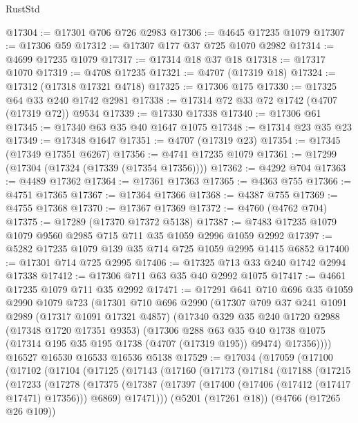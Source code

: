 \begin{lexlean}{RustStd}
\begin{coremodule}
@17304 := @17301 @706 @726 @2983
@17306 := @4645 @17235 @1079
@17307 := @17306 @59
@17312 := @17307 @177 @37 @725 @1070 @2982
@17314 := @4699 @17235 @1079
@17317 := @17314 @18 @37 @18
@17318 := @17317 @1070
@17319 := @4708 @17235
@17321 := @4707 (@17319 @18)
@17324 := @17312 (@17318 @17321 @4718)
@17325 := @17306 @175
@17330 := @17325 @64 @33 @240 @1742 @2981
@17338 := @17314 @72 @33 @72 @1742 (@4707 (@17319 @72)) @9534
@17339 := @17330 @17338
@17340 := @17306 @61
@17345 := @17340 @63 @35 @40 @1647 @1075
@17348 := @17314 @23 @35 @23
@17349 := @17348 @1647
@17351 := @4707 (@17319 @23)
@17354 := @17345 (@17349 @17351 @6267)
@17356 := @4741 @17235 @1079
@17361 := @17299 (@17304 (@17324 (@17339 (@17354 @17356))))
@17362 := @4292 @704
@17363 := @4489 @17362
@17364 := @17361 @17363
@17365 := @4363 @755
@17366 := @4751 @17365
@17367 := @17364 @17366
@17368 := @4387 @755
@17369 := @4755 @17368
@17370 := @17367 @17369
@17372 := @4760 (@4762 @704)
@17375 := @17289 (@17370 @17372 @5138)
@17387 := @7483 @17235 @1079 @1079 @9560 @2985 @715 @711 @35 @1059 @2996 @1059 @2992
@17397 := @5282 @17235 @1079 @139 @35 @714 @725 @1059 @2995 @1415 @6852
@17400 := @17301 @714 @725 @2995
@17406 := @17325 @713 @33 @240 @1742 @2994 @17338
@17412 := @17306 @711 @63 @35 @40 @2992 @1075
@17417 := @4661 @17235 @1079 @711 @35 @2992
@17471 := @17291
    @641
    @710
    @696
    @35
    @1059
    @2990
    @1079
    @723
    (@17301
      @710
      @696
      @2990
      (@17307
        @709
        @37
        @241
        @1091
        @2989
        (@17317 @1091 @17321 @4857)
        (@17340
          @329
          @35
          @240
          @1720
          @2988
          (@17348 @1720 @17351 @9353)
          (@17306
            @288
            @63
            @35
            @40
            @1738
            @1075
            (@17314 @195 @35 @195 @1738 (@4707 (@17319 @195)) @9474)
            @17356))))
    @16527
    @16530
    @16533
    @16536
    @5138
@17529 := @17034
    (@17059
      (@17100
        (@17102
          (@17104
            (@17125
              (@17143
                (@17160
                  (@17173
                    (@17184
                      (@17188
                        (@17215
                          (@17233
                            (@17278
                              (@17375
                                (@17387
                                  (@17397 (@17400 (@17406 (@17412 (@17417 @17471) @17356))) @6869)
                                  @17471)))
                            (@5201 (@17261 @18))
                            (@4766 (@17265 @26 @109))

\end{coremodule}
\end{lexlean}

